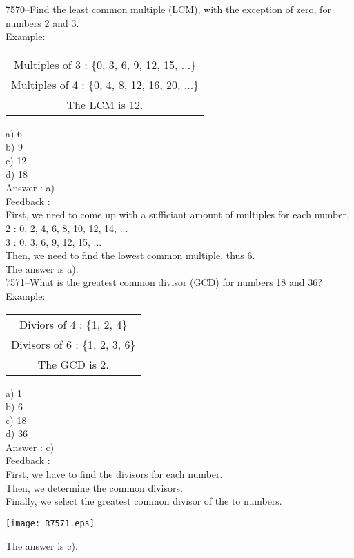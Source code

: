 \documentclass[letterpaper, 12pt]{article}
\begin{document}
7570--Find the least common multiple (LCM), with the exception of zero, for numbers 2 and 3.\\
Example:\\
\begin{center}
\begin{tabular}{|c|}
\hline
Multiples of 3 : \{0, 3, 6, 9, 12, 15, ...\}\\
Multiples of 4 : \{0, 4, 8, 12, 16, 20, ...\}\\
The LCM is 12.\\
\hline
\end{tabular}
\end{center}

a) 6\\
b) 9\\
c) 12\\
d) 18\\

Answer : a)\\

Feedback :\\
First, we need to come up with a sufficiant amount of multiples for each number.\\
2 : 0, 2, 4, 6, 8, 10, 12, 14, ...\\
3 : 0, 3, 6, 9, 12, 15, ...\\

Then, we need to find the lowest common multiple, thus 6.\\
The answer is a).\\


7571--What is the greatest common divisor (GCD) for numbers 18 and 36?\\
Example:\\
\begin{center}
\begin{tabular}{|c|}
\hline
Diviors of 4 : \{1, 2, 4\}\\
Divisors of 6 : \{1, 2, 3, 6\}\\
The GCD is 2.\\
\hline
\end{tabular}
\end{center}

a) 1\\
b) 6\\
c) 18\\
d) 36\\

Answer : c)\\

Feedback :\\
First, we have to find the divisors for each number.\\
Then, we determine the common divisors.\\
Finally, we select the greatest common divisor of the to numbers.\\
\begin{center}
\texttt{[image: R7571.eps]}\\
\end{center}
The answer is c).\\
\end{document}
